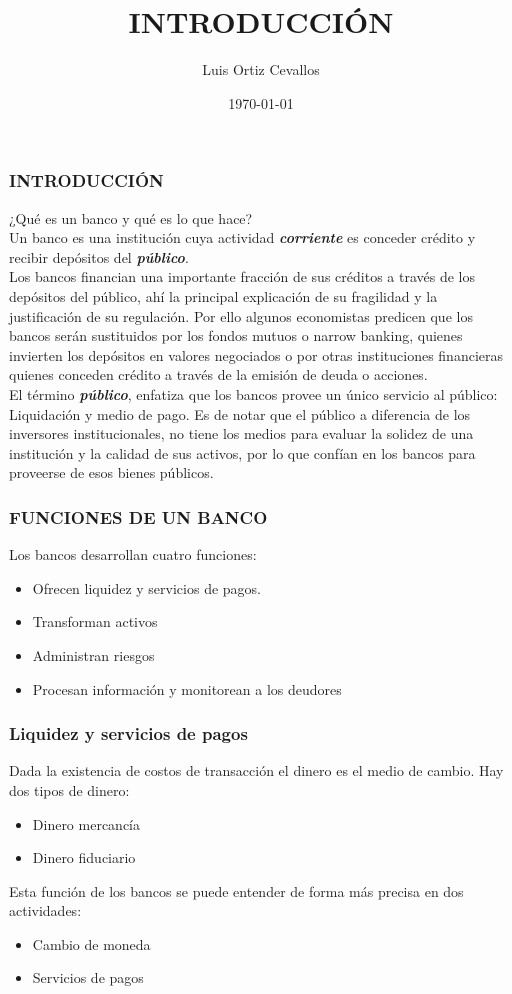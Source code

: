 \documentclass[10pt, xcolor=table, x11names]{beamer}
\title[]{INTRODUCCIÓN}
\author[Luis Ortiz]{Luis Ortiz Cevallos}
\institute[SECMCA]{\bf SECMCA}
\date[\today]{\footnotesize \today}
\begin{document}
\begin{frame}
\titlepage
\end{frame}




\begin{frame}
	\frametitle{{\normalsize INTRODUCCIÓN} {}}
	¿Qué es un banco y qué es lo que hace?\\
    Un banco es una institución cuya actividad {\bf\emph{corriente}} es conceder crédito y recibir depósitos del {\bf\emph{público}}. \\
    Los bancos financian una importante fracción de sus créditos a través de los depósitos del público, ahí la principal explicación de su fragilidad y la justificación de su regulación. Por ello algunos economistas predicen que los bancos serán sustituidos por los fondos mutuos o narrow banking, quienes invierten los depósitos en valores negociados o por otras instituciones financieras quienes conceden crédito a través de la emisión de deuda o acciones.\\
    El término {\bf\emph{público}}, enfatiza que los bancos provee un único servicio al público: Liquidación y medio de pago. Es de notar que el público a diferencia de los inversores institucionales, no tiene los medios para evaluar la solidez de una institución y la calidad de sus activos, por lo que confían en los bancos para proveerse de esos bienes públicos. 
     
    
    	
\end{frame}

\begin{frame}
    \frametitle{{\normalsize FUNCIONES DE UN BANCO} {}}
   Los bancos desarrollan cuatro funciones:
   \begin{itemize}
       \item Ofrecen liquidez y servicios de pagos.
       \item Transforman activos
       \item Administran riesgos
       \item Procesan información y monitorean a los deudores
   \end{itemize}    
\end{frame}

\begin{frame}
    \frametitle{{\normalsize Liquidez y servicios de pagos} {}}
    Dada la existencia de costos de transacción el dinero es el medio de cambio. Hay dos tipos de dinero:
    \begin{itemize}
        \item Dinero mercancía 
        \item Dinero fiduciario
    \end{itemize}
    Esta función de los bancos se puede entender de forma más precisa en dos actividades:
    \begin{itemize}
        \item Cambio de moneda
        \item Servicios de pagos
    \end{itemize}
\end{frame}
\end{document}
